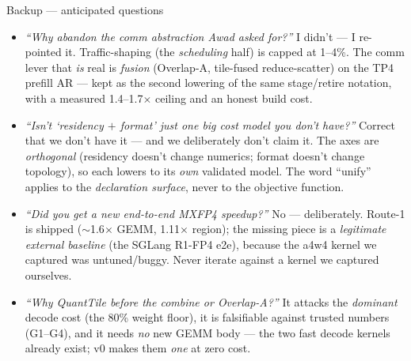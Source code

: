 \documentclass[pdf,aspectratio=169]{beamer}
\newcommand{\empy}[1]{{\color{darkorange}\emph{#1}}}
\newcommand{\empr}[1]{{\color{cardinalred}\emph{#1}}}
\newcommand{\mc}[1]{{\ttfamily\small #1}}
\begin{document}
\begin{frame}{Backup --- anticipated questions}
\footnotesize
\begin{itemize}\footnotesize
  \item \empr{``Why abandon the comm abstraction Awad asked for?''} I didn't --- I re-pointed it. Traffic-shaping (the \emph{scheduling} half) is capped at 1--4\%. The comm lever that \emph{is} real is \empy{fusion} (Overlap-A, tile-fused reduce-scatter) on the TP4 prefill AR --- kept as the second lowering of the same \mc{stage}/\mc{retire} notation, with a measured 1.4--1.7$\times$ ceiling and an honest build cost.
  \item \empr{``Isn't `residency $+$ format' just one big cost model you don't have?''} Correct that we don't have it --- and we deliberately don't claim it. The axes are \empy{orthogonal} (residency doesn't change numerics; format doesn't change topology), so each lowers to its \emph{own} validated model. The word ``unify'' applies to the \empy{declaration surface}, never to the objective function.
  \item \empr{``Did you get a new end-to-end MXFP4 speedup?''} No --- deliberately. Route-1 is shipped ($\sim$1.6$\times$ GEMM, 1.11$\times$ region); the missing piece is a \empy{legitimate external baseline} (the SGLang R1-FP4 e2e), because the a4w4 kernel we captured was untuned/buggy. Never iterate against a kernel we captured ourselves.
  \item \empr{``Why QuantTile before the combine or Overlap-A?''} It attacks the \emph{dominant} decode cost (the 80\% weight floor), it is falsifiable against trusted numbers (G1--G4), and it needs \emph{no} new GEMM body --- the two fast decode kernels already exist; v0 makes them \empy{one} at zero cost.
\end{itemize}
\end{frame}
\end{document}
